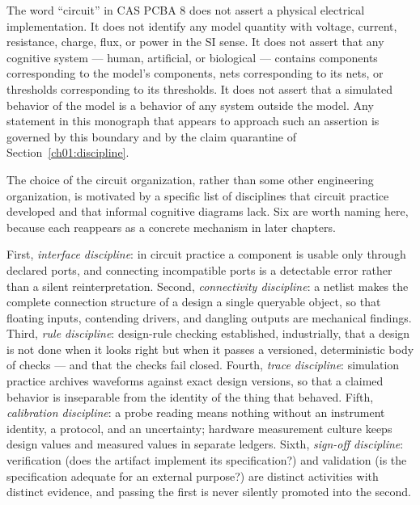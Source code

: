 \begin{boundary}\label{ch01:bnd:circuit}
The word ``circuit'' in CAS PCBA 8 does not assert a physical electrical
implementation. It does not identify any model quantity with voltage,
current, resistance, charge, flux, or power in the SI sense. It does not
assert that any cognitive system --- human, artificial, or biological ---
contains components corresponding to the model's components, nets
corresponding to its nets, or thresholds corresponding to its thresholds. It
does not assert that a simulated behavior of the model is a behavior of any
system outside the model. Any statement in this monograph that appears to
approach such an assertion is governed by this boundary and by the claim
quarantine of Section~\ref{ch01:discipline}.
\end{boundary}

The choice of the circuit organization, rather than some other engineering
organization, is motivated by a specific list of disciplines that circuit
practice developed and that informal cognitive diagrams lack. Six are worth
naming here, because each reappears as a concrete mechanism in later
chapters.

First, \emph{interface discipline}: in circuit practice a component is
usable only through declared ports, and connecting incompatible ports is a
detectable error rather than a silent reinterpretation. Second,
\emph{connectivity discipline}: a netlist makes the complete connection
structure of a design a single queryable object, so that floating inputs,
contending drivers, and dangling outputs are mechanical findings. Third,
\emph{rule discipline}: design-rule checking established, industrially, that
a design is not done when it looks right but when it passes a versioned,
deterministic body of checks --- and that the checks fail closed. Fourth,
\emph{trace discipline}: simulation practice archives waveforms against exact
design versions, so that a claimed behavior is inseparable from the identity
of the thing that behaved. Fifth, \emph{calibration discipline}: a probe
reading means nothing without an instrument identity, a protocol, and an
uncertainty; hardware measurement culture keeps design values and measured
values in separate ledgers. Sixth, \emph{sign-off discipline}: verification
(does the artifact implement its specification?) and validation (is the
specification adequate for an external purpose?) are distinct activities with
distinct evidence, and passing the first is never silently promoted into the
second.

